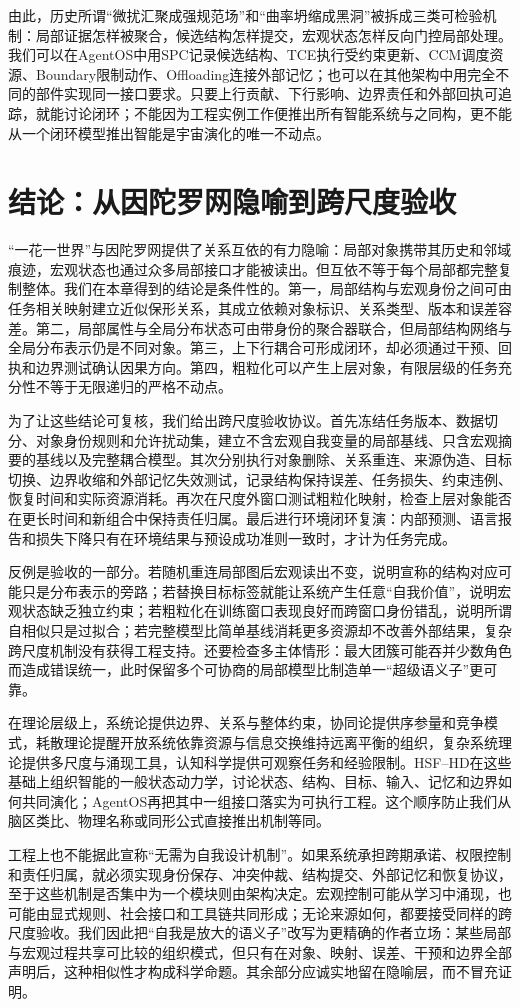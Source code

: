 由此，历史所谓“微扰汇聚成强规范场”和“曲率坍缩成黑洞”被拆成三类可检验机制：局部证据怎样被聚合，候选结构怎样提交，宏观状态怎样反向门控局部处理。我们可以在AgentOS中用SPC记录候选结构、TCE执行受约束更新、CCM调度资源、Boundary限制动作、Offloading连接外部记忆；也可以在其他架构中用完全不同的部件实现同一接口要求。只要上行贡献、下行影响、边界责任和外部回执可追踪，就能讨论闭环；不能因为工程实例工作便推出所有智能系统与之同构，更不能从一个闭环模型推出智能是宇宙演化的唯一不动点。

\section{结论：从因陀罗网隐喻到跨尺度验收}
\label{sec:section_717}
“一花一世界”与因陀罗网提供了关系互依的有力隐喻：局部对象携带其历史和邻域痕迹，宏观状态也通过众多局部接口才能被读出。但互依不等于每个局部都完整复制整体。我们在本章得到的结论是条件性的。第一，局部结构与宏观身份之间可由任务相关映射建立近似保形关系，其成立依赖对象标识、关系类型、版本和误差容差。第二，局部属性与全局分布状态可由带身份的聚合器联合，但局部结构网络与全局分布表示仍是不同对象。第三，上下行耦合可形成闭环，却必须通过干预、回执和边界测试确认因果方向。第四，粗粒化可以产生上层对象，有限层级的任务充分性不等于无限递归的严格不动点。

为了让这些结论可复核，我们给出跨尺度验收协议。首先冻结任务版本、数据切分、对象身份规则和允许扰动集，建立不含宏观自我变量的局部基线、只含宏观摘要的基线以及完整耦合模型。其次分别执行对象删除、关系重连、来源伪造、目标切换、边界收缩和外部记忆失效测试，记录结构保持误差、任务损失、约束违例、恢复时间和实际资源消耗。再次在尺度外窗口测试粗粒化映射，检查上层对象能否在更长时间和新组合中保持责任归属。最后进行环境闭环复演：内部预测、语言报告和损失下降只有在环境结果与预设成功准则一致时，才计为任务完成。

反例是验收的一部分。若随机重连局部图后宏观读出不变，说明宣称的结构对应可能只是分布表示的旁路；若替换目标标签就能让系统产生任意“自我价值”，说明宏观状态缺乏独立约束；若粗粒化在训练窗口表现良好而跨窗口身份错乱，说明所谓自相似只是过拟合；若完整模型比简单基线消耗更多资源却不改善外部结果，复杂跨尺度机制没有获得工程支持。还要检查多主体情形：最大团簇可能吞并少数角色而造成错误统一，此时保留多个可协商的局部模型比制造单一“超级语义子”更可靠。

在理论层级上，系统论提供边界、关系与整体约束，协同论提供序参量和竞争模式，耗散理论提醒开放系统依靠资源与信息交换维持远离平衡的组织，复杂系统理论提供多尺度与涌现工具，认知科学提供可观察任务和经验限制。HSF--HD在这些基础上组织智能的一般状态动力学，讨论状态、结构、目标、输入、记忆和边界如何共同演化；AgentOS再把其中一组接口落实为可执行工程。这个顺序防止我们从脑区类比、物理名称或同形公式直接推出机制等同。

工程上也不能据此宣称“无需为自我设计机制”。如果系统承担跨期承诺、权限控制和责任归属，就必须实现身份保存、冲突仲裁、结构提交、外部记忆和恢复协议，至于这些机制是否集中为一个模块则由架构决定。宏观控制可能从学习中涌现，也可能由显式规则、社会接口和工具链共同形成；无论来源如何，都要接受同样的跨尺度验收。我们因此把“自我是放大的语义子”改写为更精确的作者立场：某些局部与宏观过程共享可比较的组织模式，但只有在对象、映射、误差、干预和边界全部声明后，这种相似性才构成科学命题。其余部分应诚实地留在隐喻层，而不冒充证明。
